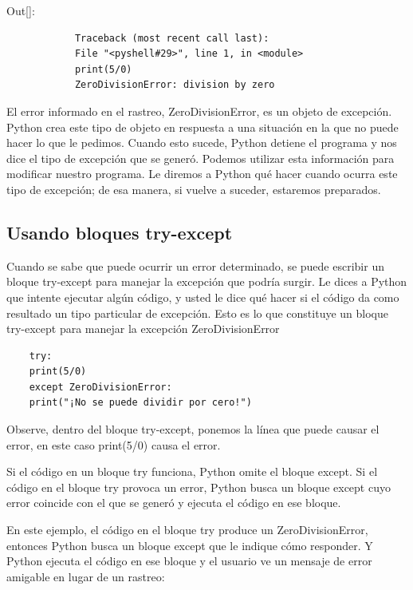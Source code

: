 {\ttfamily\scriptsize \noindent Out[]:\vspace{-0.3cm}	
	{\color{red} 	
		\begin{verbatim}
			Traceback (most recent call last):
			File "<pyshell#29>", line 1, in <module>
			print(5/0)
			ZeroDivisionError: division by zero
		\end{verbatim}
}}


El error informado en el rastreo, {\ttfamily ZeroDivisionError}, es un objeto de excepción. Python crea este tipo de objeto en respuesta a una situación en la que no puede hacer lo que le pedimos. Cuando esto sucede, Python detiene el programa y nos dice el tipo de excepción que se generó. Podemos utilizar esta información para modificar nuestro programa. Le diremos a Python qué hacer cuando ocurra este tipo de excepción; de esa manera, si vuelve a suceder, estaremos preparados. 

\subsection{Usando bloques try-except}

Cuando se sabe que puede ocurrir un error determinado, se puede escribir un bloque  {\ttfamily try-except} para
manejar la excepción que podría surgir. Le dices a Python que intente ejecutar
algún código, y usted le dice qué hacer si el código da como resultado un tipo particular
de excepción. Esto es lo que constituye un bloque  {\ttfamily try-except} para manejar la excepción {\ttfamily ZeroDivisionError} 


\begin{lstlisting}
	try:
	print(5/0)
	except ZeroDivisionError:
	print("¡No se puede dividir por cero!")
\end{lstlisting}

Observe, dentro del bloque {\ttfamily try-except}, ponemos la línea que puede causar el error, en este caso {\ttfamily print(5/0)} causa el error. 

Si el código en un bloque  {\ttfamily try} funciona, Python omite el bloque {\ttfamily except}. Si el código
en el bloque {\ttfamily try} provoca un error, Python busca un bloque {\ttfamily except} cuyo error coincide con el que se generó y ejecuta el código en ese bloque.

En este ejemplo, el código en el bloque {\ttfamily try} produce un {\ttfamily ZeroDivisionError},
entonces Python busca un bloque {\ttfamily except} que le indique cómo responder. Y Python ejecuta el código en ese bloque y
el usuario ve un mensaje de error amigable en lugar de un rastreo:

